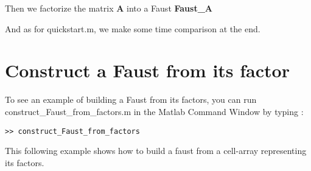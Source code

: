 
Then we factorize the matrix \textbf{A} into a Faust \textbf{Faust\_A}

And as for quickstart.m, we make some time comparison at the end.

\newpage
\section{Construct a Faust from its factor}\label{sec:firstUseBuildFactors}
To see an example of building a Faust from its factors, you can run construct\_Faust\_from\_factors.m in the Matlab Command Window by typing :
\begin{lstlisting}
>> construct_Faust_from_factors
\end{lstlisting}
This following example shows how to build a faust from a cell-array representing its factors.



 
